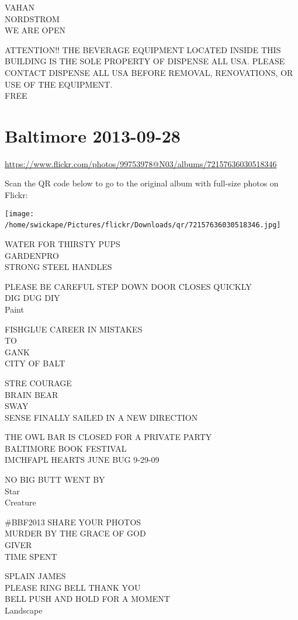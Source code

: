\documentclass[10pt,letterpaper]{article}
\begin{document}
VAHAN\\
NORDSTROM\\
WE ARE OPEN

ATTENTION!! THE BEVERAGE EQUIPMENT LOCATED INSIDE THIS BUILDING IS THE SOLE PROPERTY OF DISPENSE ALL USA.  PLEASE CONTACT DISPENSE ALL USA BEFORE REMOVAL, RENOVATIONS, OR USE OF THE EQUIPMENT.\\
FREE
\

\section*{Baltimore 2013-09-28}

\url{https://www.flickr.com/photos/99753978@N03/albums/72157636030518346}

Scan the QR code below to go to the original album with full-size photos on Flickr:

\texttt{[image: /home/swickape/Pictures/flickr/Downloads/qr/72157636030518346.jpg]}
\

WATER FOR THIRSTY PUPS\\
GARDENPRO\\
STRONG STEEL HANDLES

PLEASE BE CAREFUL STEP DOWN DOOR CLOSES QUICKLY\\
DIG DUG DIY\\
Paint

FISHGLUE CAREER IN MISTAKES\\
TO\\
GANK\\
CITY OF BALT

STRE COURAGE\\
BRAIN BEAR\\
SWAY\\
SENSE FINALLY SAILED IN A NEW DIRECTION

THE OWL BAR IS CLOSED FOR A PRIVATE PARTY\\
BALTIMORE BOOK FESTIVAL\\
IMCHFAPL HEARTS JUNE BUG 9{-}29{-}09

NO BIG BUTT WENT BY\\
Star\\
Creature

\#BBF2013 SHARE YOUR PHOTOS\\
MURDER BY THE GRACE OF GOD\\
GIVER\\
TIME SPENT

SPLAIN JAMES\\
PLEASE RING BELL THANK YOU\\
BELL PUSH AND HOLD FOR A MOMENT\\
Landscape
\end{document}
